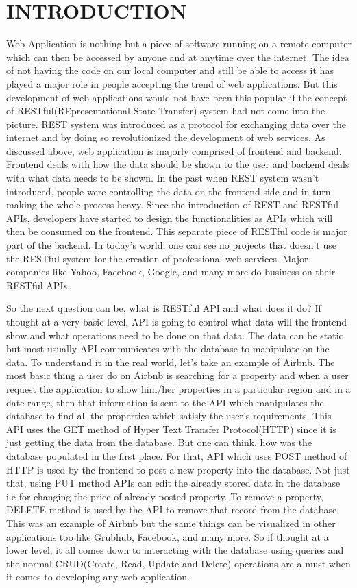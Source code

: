\documentclass[letterpaper, 10 pt, conference]{ieeeconf}
\begin{document}
\section{INTRODUCTION}
Web Application is nothing but a piece of software running on a remote computer which can then be accessed by anyone and at anytime over the internet. The idea of not having the code on our local computer and still be able to access it has played a major role in people accepting the trend of web applications. But this development of web applications would not have been this popular if the concept of RESTful(REpresentational State Transfer) system had not come into the picture. REST system was introduced as a protocol for exchanging data over the internet and by doing so revolutionized the development of web services. As discussed above, web application is majorly comprised of frontend and backend. Frontend deals with how the data should be shown to the user and backend deals with what data needs to be shown. In the past when REST system wasn't introduced, people were controlling the data on the frontend side and in turn making the whole process heavy. Since the introduction of REST and RESTful APIs, developers have started to design the functionalities as APIs which will then be consumed on the frontend. This separate piece of RESTful code is major part of the backend. In today's world, one can see no projects that doesn't use the RESTful system for the creation of professional web services. Major companies like Yahoo, Facebook, Google, and many more do business on their RESTful APIs.

So the next question can be, what is RESTful API and what does it do? If thought at a very basic level, API is going to control what data will the frontend show and what operations need to be done on that data. The data can be static but most usually API communicates with the database to manipulate on the data. To understand it in the real world, let's take an example of Airbnb. The most basic thing a user do on Airbnb is searching for a property and when a user request the application to show him/her properties in a particular region and in a date range, then that information is sent to the API which manipulates the database to find all the properties which satisfy the user's requirements. This API uses the GET method of Hyper Text Transfer Protocol(HTTP) since it is just getting the data from the database. But one can think, how was the database populated in the first place. For that, API which uses POST method of HTTP is used by the frontend to post a new property into the database. Not just that, using PUT method APIs can edit the already stored data in the database i.e for changing the price of already posted property. To remove a property, DELETE method is used by the API to remove that record from the database. This was an example of Airbnb but the same things can be visualized in other applications too like Grubhub, Facebook, and many more. So if thought at a lower level, it all comes down to interacting with the database using queries and the normal CRUD(Create, Read, Update and Delete) operations are a must when it comes to developing any web application.
\end{document}
